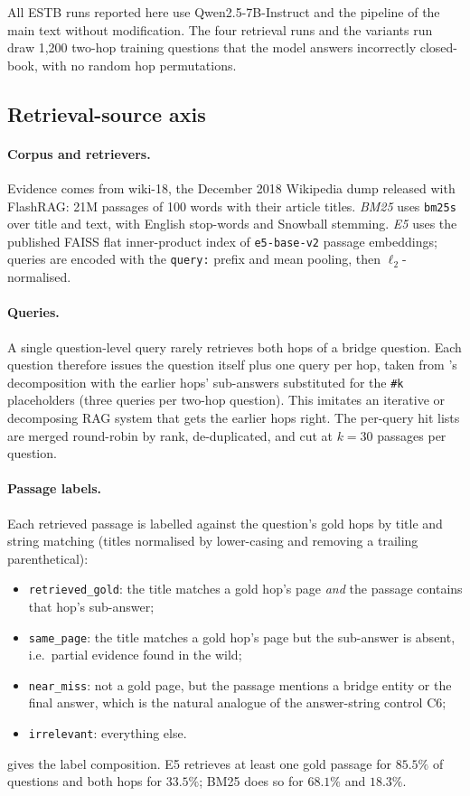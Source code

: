 All ESTB runs reported here use Qwen2.5-7B-Instruct and the pipeline of the main text without modification. The four retrieval runs and the variants run draw 1{,}200 two-hop \musique{} training questions that the model answers incorrectly closed-book, with no random hop permutations.

\subsection{Retrieval-source axis}
\label{app:estb-retrieval}

\paragraph{Corpus and retrievers.} Evidence comes from wiki-18, the December 2018 Wikipedia dump released with FlashRAG: 21M passages of 100 words with their article titles. \emph{BM25} uses \texttt{bm25s} over title and text, with English stop-words and Snowball stemming. \emph{E5} uses the published FAISS flat inner-product index of \texttt{e5-base-v2} passage embeddings; queries are encoded with the \texttt{query:} prefix and mean pooling, then $\ell_2$-normalised.

\paragraph{Queries.} A single question-level query rarely retrieves both hops of a bridge question. Each question therefore issues the question itself plus one query per hop, taken from \musique{}'s decomposition with the earlier hops' sub-answers substituted for the \texttt{\#k} placeholders (three queries per two-hop question). This imitates an iterative or decomposing RAG system that gets the earlier hops right. The per-query hit lists are merged round-robin by rank, de-duplicated, and cut at $k=30$ passages per question.

\paragraph{Passage labels.} Each retrieved passage is labelled against the question's gold hops by title and string matching (titles normalised by lower-casing and removing a trailing parenthetical):
\begin{itemize}
  \item \texttt{retrieved\_gold}: the title matches a gold hop's page \emph{and} the passage contains that hop's sub-answer;
  \item \texttt{same\_page}: the title matches a gold hop's page but the sub-answer is absent, i.e.\ partial evidence found in the wild;
  \item \texttt{near\_miss}: not a gold page, but the passage mentions a bridge entity or the final answer, which is the natural analogue of the answer-string control C6;
  \item \texttt{irrelevant}: everything else.
\end{itemize}
 gives the label composition. E5 retrieves at least one gold passage for $85.5\%$ of questions and both hops for $33.5\%$; BM25 does so for $68.1\%$ and $18.3\%$.

